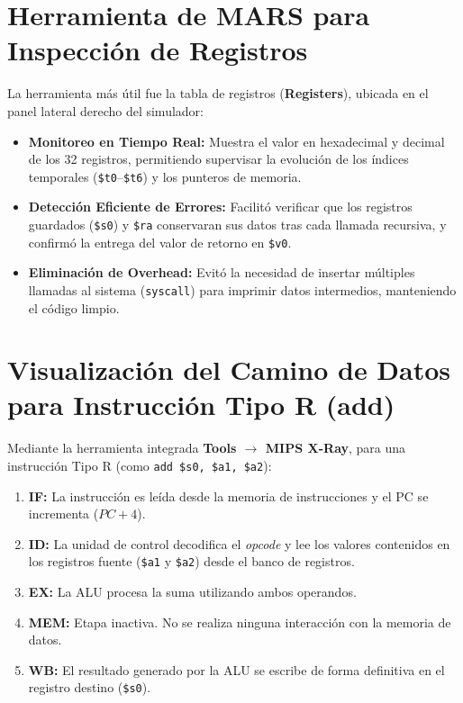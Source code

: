 \documentclass[12pt,a4paper]{article}
\begin{document}
	
	\section{Herramienta de MARS para Inspección de Registros}
	
	La herramienta más útil fue la tabla de registros (\textbf{Registers}), ubicada en el panel lateral derecho del simulador:
	
	\begin{itemize}
		\item \textbf{Monitoreo en Tiempo Real:} Muestra el valor en hexadecimal y decimal de los 32 registros, permitiendo supervisar la evolución de los índices temporales (\texttt{\$t0}--\texttt{\$t6}) y los punteros de memoria.
		\item \textbf{Detección Eficiente de Errores:} Facilitó verificar que los registros guardados (\texttt{\$s0}) y \texttt{\$ra} conservaran sus datos tras cada llamada recursiva, y confirmó la entrega del valor de retorno en \texttt{\$v0}.
		\item \textbf{Eliminación de Overhead:} Evitó la necesidad de insertar múltiples llamadas al sistema (\texttt{syscall}) para imprimir datos intermedios, manteniendo el código limpio.
	\end{itemize}
	
	
	\section{Visualización del Camino de Datos para Instrucción Tipo R (add)}
	
	Mediante la herramienta integrada \textbf{Tools $\rightarrow$ MIPS X-Ray}, para una instrucción Tipo R (como \texttt{add \$s0, \$a1, \$a2}):
	\begin{enumerate}
		\item \textbf{IF:} La instrucción es leída desde la memoria de instrucciones y el PC se incrementa ($PC + 4$).
		\item \textbf{ID:} La unidad de control decodifica el \textit{opcode} y lee los valores contenidos en los registros fuente (\texttt{\$a1} y \texttt{\$a2}) desde el banco de registros.
		\item \textbf{EX:} La ALU procesa la suma utilizando ambos operandos.
		\item \textbf{MEM:} Etapa inactiva. No se realiza ninguna interacción con la memoria de datos.
		\item \textbf{WB:} El resultado generado por la ALU se escribe de forma definitiva en el registro destino (\texttt{\$s0}).
	\end{enumerate}
	
\end{document}
